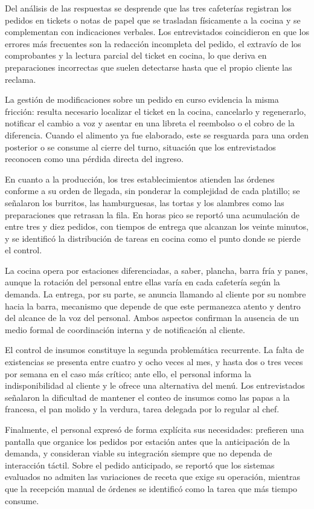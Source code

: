 Del análisis de las respuestas se desprende que las tres cafeterías registran los pedidos en tickets o notas de papel que se trasladan físicamente a la cocina y se complementan con indicaciones verbales. Los entrevistados coincidieron en que los errores más frecuentes son la redacción incompleta del pedido, el extravío de los comprobantes y la lectura parcial del ticket en cocina, lo que deriva en preparaciones incorrectas que suelen detectarse hasta que el propio cliente las reclama.

La gestión de modificaciones sobre un pedido en curso evidencia la misma fricción: resulta necesario localizar el ticket en la cocina, cancelarlo y regenerarlo, notificar el cambio a voz y asentar en una libreta el reembolso o el cobro de la diferencia. Cuando el alimento ya fue elaborado, este se resguarda para una orden posterior o se consume al cierre del turno, situación que los entrevistados reconocen como una pérdida directa del ingreso.

En cuanto a la producción, los tres establecimientos atienden las órdenes conforme a su orden de llegada, sin ponderar la complejidad de cada platillo; se señalaron los burritos, las hamburguesas, las tortas y los alambres como las preparaciones que retrasan la fila. En horas pico se reportó una acumulación de entre tres y diez pedidos, con tiempos de entrega que alcanzan los veinte minutos, y se identificó la distribución de tareas en cocina como el punto donde se pierde el control.

La cocina opera por estaciones diferenciadas, a saber, plancha, barra fría y panes, aunque la rotación del personal entre ellas varía en cada cafetería según la demanda. La entrega, por su parte, se anuncia llamando al cliente por su nombre hacia la barra, mecanismo que depende de que este permanezca atento y dentro del alcance de la voz del personal. Ambos aspectos confirman la ausencia de un medio formal de coordinación interna y de notificación al cliente.

El control de insumos constituye la segunda problemática recurrente. La falta de existencias se presenta entre cuatro y ocho veces al mes, y hasta dos o tres veces por semana en el caso más crítico; ante ello, el personal informa la indisponibilidad al cliente y le ofrece una alternativa del menú. Los entrevistados señalaron la dificultad de mantener el conteo de insumos como las papas a la francesa, el pan molido y la verdura, tarea delegada por lo regular al chef.

Finalmente, el personal expresó de forma explícita sus necesidades: prefieren una pantalla que organice los pedidos por estación antes que la anticipación de la demanda, y consideran viable su integración siempre que no dependa de interacción táctil. Sobre el pedido anticipado, se reportó que los sistemas evaluados no admiten las variaciones de receta que exige su operación, mientras que la recepción manual de órdenes se identificó como la tarea que más tiempo consume.

